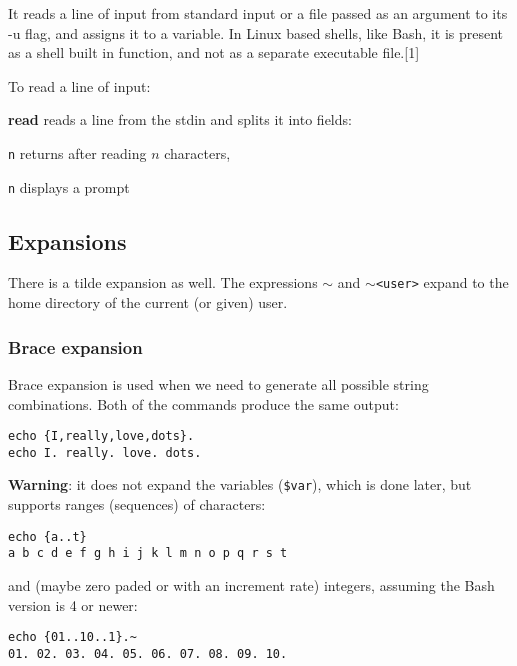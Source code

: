 It reads a line of input from standard input or a file passed as an argument to its -u flag, and assigns it to a variable. In Linux based shells, like Bash, it is present as a shell built in function, and not as a separate executable file.[1]

To read a line of input:
\begin{enumx}
\item [\cmd] \textbf{read} reads a line from the stdin and splits it into fields:
\item [\texttt{n}] returns after reading $n$ characters, 
\item [\texttt{n}] displays a prompt 
\end{enumx}

\subsection{Expansions}
There is a tilde expansion as well.
The expressions \texttt{$\sim$} and \texttt{$\sim$<user>} expand to the home directory of the current (or given) user. 

\subsubsection{Brace expansion}
Brace expansion is used when we need to generate all possible string combinations.
Both of the commands produce the same output:
\begin{verbatim}
echo {I,really,love,dots}.
echo I. really. love. dots.
\end{verbatim}

\textbf{Warning}: it does not expand the variables (\texttt{\$var}), which is done later, but supports ranges (sequences) of characters:
\begin{verbatim}
echo {a..t}
a b c d e f g h i j k l m n o p q r s t
\end{verbatim}

and (maybe zero paded or with an increment rate) integers, assuming the Bash version is 4 or newer:

\begin{verbatim}
echo {01..10..1}.~
01. 02. 03. 04. 05. 06. 07. 08. 09. 10.
\end{verbatim}

